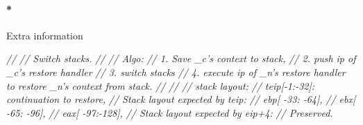 \documentclass[]{article}
\newenvironment{Shaded}{}{}
\newcommand{\CommentTok}[1]{\textcolor[rgb]{0.50,0.50,0.50}{\textit{{#1}}}}
\let\oldparagraph\paragraph
\renewcommand{\paragraph}[1]{\oldparagraph{#1}\mbox{}}
\begin{document}
\paragraph*{Extra information}\label{extra-information}

\begin{Shaded}
\begin{Highlighting}[]

        \CommentTok{//}
        \CommentTok{// Switch stacks.}
        \CommentTok{//}
        \CommentTok{// Algo:}
        \CommentTok{//   1. Save _c's context to stack,}
        \CommentTok{//   2. push ip of _c's restore handler}
        \CommentTok{//   3. switch stacks}
        \CommentTok{//   4. execute ip of _n's restore handler to restore _n's context from stack.}
        \CommentTok{//}
        \CommentTok{//}
        \CommentTok{// stack layout:}
        \CommentTok{//  teip[-1:-32]: continuation to restore,}
        \CommentTok{//  Stack layout expected by teip:}
        \CommentTok{//     ebp[ -33: -64],}
        \CommentTok{//     ebx[ -65: -96],}
        \CommentTok{//     eax[ -97:-128],}
        \CommentTok{//     Stack layout expected by eip+4:}
        \CommentTok{//        Preserved.}


\end{Highlighting}
\end{Shaded}
\end{document}
